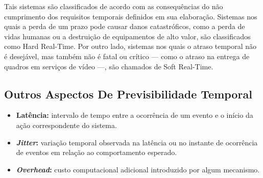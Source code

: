 Tais sistemas são classificados de acordo com as consequências do não cumprimento dos requisitos temporais definidos em sua elaboração.
Sistemas nos quais a perda de um prazo pode causar danos catastróficos, como a perda de vidas humanas ou a destruição de equipamentos de alto valor, são classificados como Hard Real-Time.
Por outro lado, sistemas nos quais o atraso temporal não é desejável, mas também não é fatal ou crítico — como o atraso na entrega de quadros em serviços de vídeo —, são chamados de Soft Real-Time.

\subsection{Outros Aspectos De Previsibilidade Temporal}

\begin{itemize}
    \item \textbf{Latência:} intervalo de tempo entre a ocorrência de um evento e o início da ação correspondente do sistema.

    \item \textbf{\textit{Jitter}:} variação temporal observada na latência ou no instante de ocorrência de eventos em relação ao comportamento esperado.

    \item \textbf{\textit{Overhead}:} custo computacional adicional introduzido por algum mecanismo.
\end{itemize}



